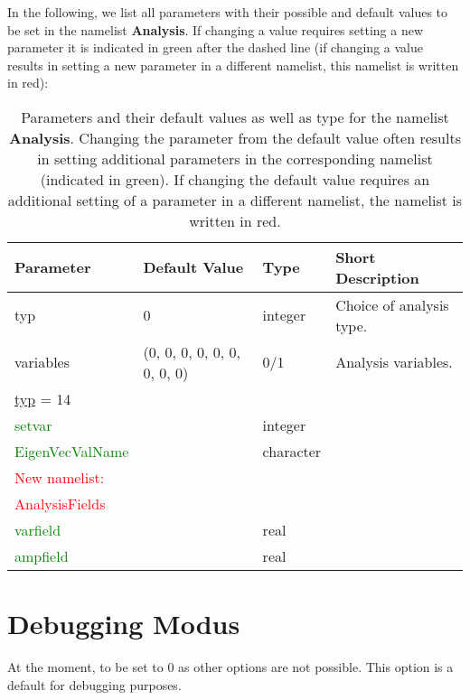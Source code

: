 \documentclass[12pt,twoside]{article}
\begin{document}
In the following, we list all parameters with their possible and default values to be set in the namelist \textbf{Analysis}.
If changing a value requires setting a new 
parameter it is indicated in green after the dashed line (if changing a value results in setting a new 
parameter in a different namelist, this namelist is written in red):\\

\begin{table}[H]
\caption{Parameters and their default values as well as type for the namelist \textbf{Analysis}.
         Changing the parameter from the default value often results in setting additional parameters 
         in the corresponding namelist (indicated in green). 
         If changing the default value requires an additional setting of a parameter in a different namelist, 
         the namelist is written in red.}
\begin{center}
\begin{tabular}{|p{4cm}|p{2.7cm}|p{2cm}|p{4cm}|}
\hline
Parameter & Default Value & Type & Short Description \\
\hline
\hline
typ & 0 & integer & Choice of analysis type. \\
variables & (0, 0, 0, 0, 0, 0, 0, 0, 0) & 0/1 & Analysis variables.\\
\hdashline
\uline{typ} = 14 & & & \\
\textcolor{green}{setvar} & & integer & \\
\textcolor{green}{EigenVecValName} & & character & \\
\textcolor{red}{New namelist:} & & &\\
\textcolor{red}{AnalysisFields} & & &\\
\textcolor{green}{varfield} & & real & \\
\textcolor{green}{ampfield} & & real & \\
\hline
\end{tabular}
\end{center}
\label{analysis-table}
\end{table}

\newpage

\section{Debugging Modus}
\label{sec-block-dbg}

At the moment, to be set to $0$ as other options are not possible.
This option is a default for debugging purposes.
\end{document}
